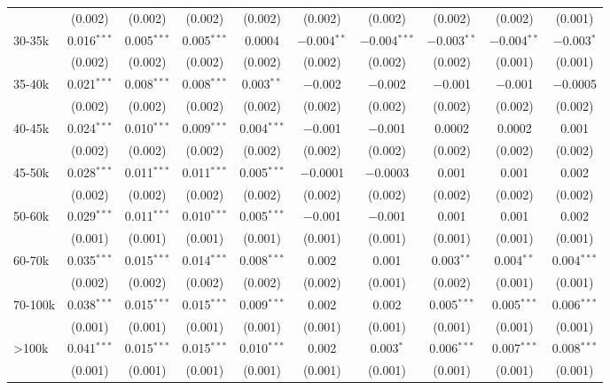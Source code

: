 \begin{table}[!htbp]
{\begin{tabular}{@{\extracolsep{5pt}}lccccccccc}
  & (0.002) & (0.002) & (0.002) & (0.002) & (0.002) & (0.002) & (0.002) & (0.002) & (0.001) \\
  30-35k & 0.016$^{***}$ & 0.005$^{***}$ & 0.005$^{***}$ & 0.0004 & $-$0.004$^{**}$ & $-$0.004$^{***}$ & $-$0.003$^{**}$ & $-$0.004$^{**}$ & $-$0.003$^{*}$ \\
  & (0.002) & (0.002) & (0.002) & (0.002) & (0.002) & (0.002) & (0.002) & (0.001) & (0.001) \\
  35-40k & 0.021$^{***}$ & 0.008$^{***}$ & 0.008$^{***}$ & 0.003$^{**}$ & $-$0.002 & $-$0.002 & $-$0.001 & $-$0.001 & $-$0.0005 \\
  & (0.002) & (0.002) & (0.002) & (0.002) & (0.002) & (0.002) & (0.002) & (0.002) & (0.002) \\
  40-45k & 0.024$^{***}$ & 0.010$^{***}$ & 0.009$^{***}$ & 0.004$^{***}$ & $-$0.001 & $-$0.001 & 0.0002 & 0.0002 & 0.001 \\
  & (0.002) & (0.002) & (0.002) & (0.002) & (0.002) & (0.002) & (0.002) & (0.002) & (0.002) \\
  45-50k & 0.028$^{***}$ & 0.011$^{***}$ & 0.011$^{***}$ & 0.005$^{***}$ & $-$0.0001 & $-$0.0003 & 0.001 & 0.001 & 0.002 \\
  & (0.002) & (0.002) & (0.002) & (0.002) & (0.002) & (0.002) & (0.002) & (0.002) & (0.002) \\
  50-60k & 0.029$^{***}$ & 0.011$^{***}$ & 0.010$^{***}$ & 0.005$^{***}$ & $-$0.001 & $-$0.001 & 0.001 & 0.001 & 0.002 \\
  & (0.001) & (0.001) & (0.001) & (0.001) & (0.001) & (0.001) & (0.001) & (0.001) & (0.001) \\
  60-70k & 0.035$^{***}$ & 0.015$^{***}$ & 0.014$^{***}$ & 0.008$^{***}$ & 0.002 & 0.001 & 0.003$^{**}$ & 0.004$^{**}$ & 0.004$^{***}$ \\
  & (0.002) & (0.002) & (0.002) & (0.002) & (0.002) & (0.001) & (0.002) & (0.001) & (0.001) \\
  70-100k & 0.038$^{***}$ & 0.015$^{***}$ & 0.015$^{***}$ & 0.009$^{***}$ & 0.002 & 0.002 & 0.005$^{***}$ & 0.005$^{***}$ & 0.006$^{***}$ \\
  & (0.001) & (0.001) & (0.001) & (0.001) & (0.001) & (0.001) & (0.001) & (0.001) & (0.001) \\
  >100k & 0.041$^{***}$ & 0.015$^{***}$ & 0.015$^{***}$ & 0.010$^{***}$ & 0.002 & 0.003$^{*}$ & 0.006$^{***}$ & 0.007$^{***}$ & 0.008$^{***}$ \\
  & (0.001) & (0.001) & (0.001) & (0.001) & (0.001) & (0.001) & (0.001) & (0.001) & (0.001) \\

\end{tabular}}
\end{table}
